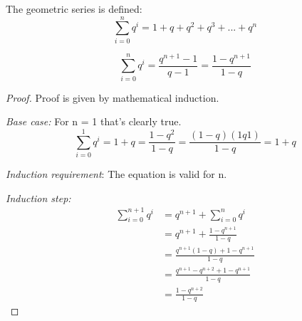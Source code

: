 \begin{definition}
    The geometric series is defined:
    \begin{equation}
        \sum_{i=0}^{n}q^i = 1 + q + q^2 + q^3 + ... + q^n
    \end{equation}
\end{definition}

\begin{lemma}
    \begin{equation}
        \sum_{i=0}^{n}q^i = \frac{q^{n+1}-1}{q-1} = \frac{1-q^{n+1}}{1-q}
    \end{equation}
\end{lemma}
\begin{proof}
    Proof is given by mathematical induction.

    \emph{Base case:} For n = 1 that's clearly true.
    \begin{equation}
        \sum_{i=0}^{1}q^i = 1 + q = \frac{1-q^2}{1-q} = \frac{(1-q)(1q1)}{1-q} = 1 + q 
    \end{equation}
    
    \emph{Induction requirement}: The equation is valid for n.

    \emph{Induction step:} 
    \begin{equation}
        \begin{split}
            \sum_{i=0}^{n+1}q^i & = q^{n+1} + \sum_{i=0}^{n}q^i \\
                                & = q^{n+1} + \frac{1 - q^{n+1}}{1-q} \\
                                & = \frac{q^{n+1}(1-q) + 1 - q^{n+1}}{1-q} \\
                                & = \frac{q^{n+1} - q^{n+2} + 1 - q^{n+1}}{1-q} \\
                                & = \frac{1 - q^{n+2}}{1-q}
        \end{split}
    \end{equation}
\end{proof}

